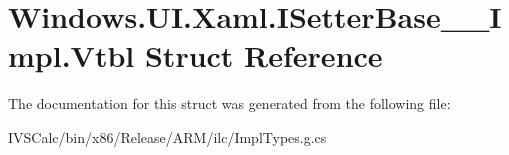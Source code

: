 \hypertarget{struct_windows_1_1_u_i_1_1_xaml_1_1_i_setter_base_____impl_1_1_vtbl}{}\section{Windows.\+U\+I.\+Xaml.\+I\+Setter\+Base\+\_\+\+\_\+\+Impl.\+Vtbl Struct Reference}
\label{struct_windows_1_1_u_i_1_1_xaml_1_1_i_setter_base_____impl_1_1_vtbl}


The documentation for this struct was generated from the following file\+:\begin{DoxyCompactItemize}
\item 
I\+V\+S\+Calc/bin/x86/\+Release/\+A\+R\+M/ilc/Impl\+Types.\+g.\+cs\end{DoxyCompactItemize}
